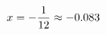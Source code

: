 \documentclass[preview]{standalone}
\begin{document}
\begin{align*}
\special{dvisvgm:raw <g id='unique000'>}x = - \frac{1}{12} \approx -0.083\special{dvisvgm:raw </g>}
\end{align*}
\end{document}

